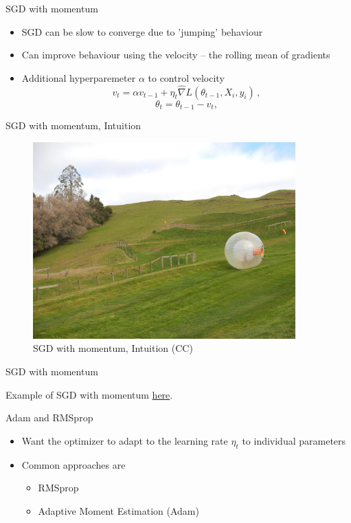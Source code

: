 \documentclass[10pt,handout]{beamer}
\begin{document}
\begin{frame}{SGD with momentum}

\begin{itemize}
\item SGD can be slow to converge due to 'jumping' behaviour
\item Can improve behaviour using the velocity -- the rolling mean of gradients
\item Additional hyperparemeter $\alpha$ to control velocity
\[
v_t = \alpha v_{t-1} + \eta_t \hat{\nabla} L(\theta_{t-1}, X_{i}, y_{i})\,,
\]
\[
\theta_t = \theta_{t-1} - v_t,
\]

\end{itemize}


\end{frame}


\begin{frame}{SGD with momentum, Intuition}

\begin{figure}[h]
\caption{SGD with momentum, Intuition (CC)}
\centering
\includegraphics[width=0.9\textwidth]{figs/zorb}
\end{figure}

\end{frame}

\begin{frame}{SGD with momentum}

Example of SGD with momentum \href{https://distill.pub/2017/momentum/}{here}.

\end{frame}


\begin{frame}{Adam and RMSprop}

\begin{itemize}
\item Want the optimizer to adapt to the learning rate $\eta_t$ to individual parameters
\item Common approaches are
\begin{itemize}
\item RMSprop
\item Adaptive Moment Estimation (Adam)
\end{itemize}
\end{itemize}

\end{frame}
\end{document}
